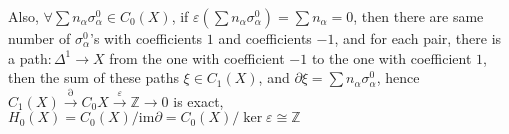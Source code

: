 \documentclass[12pt]{article}
\begin{document}
Also, $\forall \sum n_\alpha\sigma^0_\alpha\in C_0(X)$, if $\varepsilon(\sum n_\alpha\sigma^0_\alpha)=\sum n_\alpha=0$, then there are same number of $\sigma^0_\alpha$'s with coefficients $1$ and coefficients $-1$, and for each pair, there is a path$: \Delta^1\rightarrow X$ from the one with coefficient $-1$ to the one with coefficient $1$, then the sum of these paths $\xi\in C_1(X)$, and $\partial\xi=\sum n_\alpha\sigma^0_\alpha$, hence $C_1(X)\xrightarrow{\partial}C_0{X}\xrightarrow{\varepsilon}\mathbb{Z}\rightarrow 0$ is exact, $H_0(X)=C_0(X)/\mathrm{im}\partial=C_0(X)/\ker\varepsilon\cong\mathbb{Z}$ \par
\end{document}
